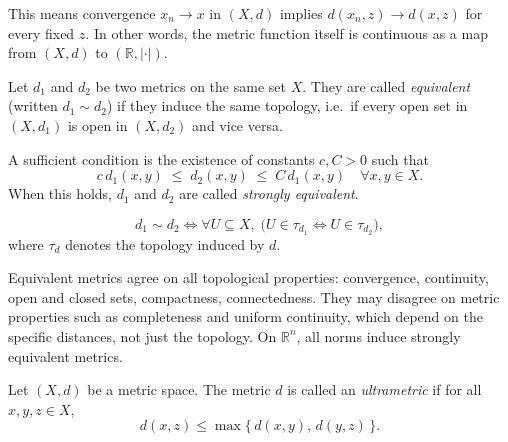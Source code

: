 \begin{remark*}[Consequence]
This means convergence $x_n \to x$ in $(X,d)$ implies
$d(x_n,z) \to d(x,z)$ for every fixed $z$.
In other words, the metric function itself is continuous as a map
from $(X,d)$ to $(\mathbb{R}, |\cdot|)$.
\end{remark*}

\begin{tcolorbox}[colback=propbox, colframe=propborder, arc=2pt,
  left=6pt, right=6pt, top=4pt, bottom=4pt,
  title={\small\textbf{Definition (Equivalent Metrics)}},
  fonttitle=\small\bfseries]
\begin{definition}
\label{def:equivalent-metrics}
Let $d_1$ and $d_2$ be two metrics on the same set $X$.
They are called \emph{equivalent} (written $d_1 \sim d_2$) if they induce
the same topology, i.e.\ if every open set in $(X,d_1)$ is open in
$(X,d_2)$ and vice versa.

A sufficient condition is the existence of constants $c, C > 0$ such that
\[
c\, d_1(x,y) \;\le\; d_2(x,y) \;\le\; C\, d_1(x,y)
\quad \forall x,y \in X.
\]
When this holds, $d_1$ and $d_2$ are called \emph{strongly equivalent}.
\end{definition}
\end{tcolorbox}

\begin{remark*}
\[
d_1 \sim d_2
\iff
\forall U \subseteq X,\;
\bigl(U \in \tau_{d_1} \iff U \in \tau_{d_2}\bigr),
\]
where $\tau_d$ denotes the topology induced by $d$.
\end{remark*}

\begin{remark*}[Consequence]
Equivalent metrics agree on all topological properties: convergence,
continuity, open and closed sets, compactness, connectedness.
They may disagree on metric properties such as completeness and uniform
continuity, which depend on the specific distances, not just the topology.
On $\mathbb{R}^n$, all norms induce strongly equivalent metrics.
\end{remark*}

\begin{tcolorbox}[colback=propbox, colframe=propborder, arc=2pt,
  left=6pt, right=6pt, top=4pt, bottom=4pt,
  title={\small\textbf{Definition (Ultrametric)}},
  fonttitle=\small\bfseries]
\begin{definition}[Ultrametric]
\label{def:ultrametric}
Let $(X,d)$ be a metric space.
The metric $d$ is called an \emph{ultrametric} if for all $x,y,z \in X$,
\[
d(x,z) \le \max\{\, d(x,y),\, d(y,z) \,\}.
\]
\end{definition}
\end{tcolorbox}

